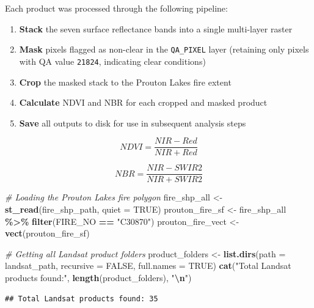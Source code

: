 \documentclass[
]{article}
\newenvironment{Shaded}{\begin{snugshade}}{\end{snugshade}}
\newcommand{\AttributeTok}[1]{\textcolor[rgb]{0.13,0.29,0.53}{#1}}
\newcommand{\CommentTok}[1]{\textcolor[rgb]{0.56,0.35,0.01}{\textit{#1}}}
\newcommand{\ConstantTok}[1]{\textcolor[rgb]{0.56,0.35,0.01}{#1}}
\newcommand{\FunctionTok}[1]{\textcolor[rgb]{0.13,0.29,0.53}{\textbf{#1}}}
\newcommand{\NormalTok}[1]{#1}
\newcommand{\OtherTok}[1]{\textcolor[rgb]{0.56,0.35,0.01}{#1}}
\newcommand{\SpecialCharTok}[1]{\textcolor[rgb]{0.81,0.36,0.00}{\textbf{#1}}}
\newcommand{\StringTok}[1]{\textcolor[rgb]{0.31,0.60,0.02}{#1}}
\providecommand{\tightlist}{%
  \setlength{\itemsep}{0pt}\setlength{\parskip}{0pt}}
\begin{document}
Each product was processed through the following pipeline:

\begin{enumerate}
\def\labelenumi{\arabic{enumi}.}
\tightlist
\item
  \textbf{Stack} the seven surface reflectance bands into a single
  multi-layer raster
\item
  \textbf{Mask} pixels flagged as non-clear in the \texttt{QA\_PIXEL}
  layer (retaining only pixels with QA value \texttt{21824}, indicating
  clear conditions)
\item
  \textbf{Crop} the masked stack to the Prouton Lakes fire extent
\item
  \textbf{Calculate} NDVI and NBR for each cropped and masked product
\item
  \textbf{Save} all outputs to disk for use in subsequent analysis steps
\end{enumerate}

\[NDVI = \frac{NIR - Red}{NIR + Red}\]

\[NBR = \frac{NIR - SWIR2}{NIR + SWIR2}\]

\begin{Shaded}
\begin{Highlighting}[]
\CommentTok{\# Loading the Prouton Lakes fire polygon}
\NormalTok{fire\_shp\_all     }\OtherTok{\textless{}{-}} \FunctionTok{st\_read}\NormalTok{(fire\_shp\_path, }\AttributeTok{quiet =} \ConstantTok{TRUE}\NormalTok{)}
\NormalTok{prouton\_fire\_sf  }\OtherTok{\textless{}{-}}\NormalTok{ fire\_shp\_all }\SpecialCharTok{\%\textgreater{}\%} \FunctionTok{filter}\NormalTok{(FIRE\_NO }\SpecialCharTok{==} \StringTok{"C30870"}\NormalTok{)}
\NormalTok{prouton\_fire\_vect }\OtherTok{\textless{}{-}} \FunctionTok{vect}\NormalTok{(prouton\_fire\_sf)}

\CommentTok{\# Getting all Landsat product folders}
\NormalTok{product\_folders }\OtherTok{\textless{}{-}} \FunctionTok{list.dirs}\NormalTok{(}\AttributeTok{path =}\NormalTok{ landsat\_path, }\AttributeTok{recursive =} \ConstantTok{FALSE}\NormalTok{, }\AttributeTok{full.names =} \ConstantTok{TRUE}\NormalTok{)}
\FunctionTok{cat}\NormalTok{(}\StringTok{"Total Landsat products found:"}\NormalTok{, }\FunctionTok{length}\NormalTok{(product\_folders), }\StringTok{"}\SpecialCharTok{\textbackslash{}n}\StringTok{"}\NormalTok{)}
\end{Highlighting}
\end{Shaded}

\begin{verbatim}
## Total Landsat products found: 35
\end{verbatim}
\end{document}
